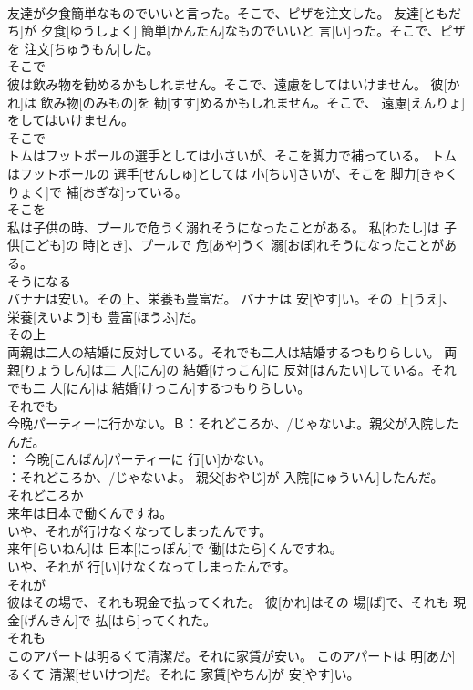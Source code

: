 \documentclass[8pt]{extreport}
\begin{document}
\begin{CJK}{UTF8}{min}
\\	友達が夕食簡単なものでいいと言った。そこで、ピザを注文した。	友達[ともだち]が 夕食[ゆうしょく] 簡単[かんたん]なものでいいと 言[い]った。そこで、ピザを 注文[ちゅうもん]した。	
\\	そこで	
\\	彼は飲み物を勧めるかもしれません。そこで、遠慮をしてはいけません。	彼[かれ]は 飲み物[のみもの]を 勧[すす]めるかもしれません。そこで、 遠慮[えんりょ]をしてはいけません。	
\\	そこで 
\\	トムはフットボールの選手としては小さいが、そこを脚力で補っている。	トムはフットボールの 選手[せんしゅ]としては 小[ちい]さいが、そこを 脚力[きゃくりょく]で 補[おぎな]っている。	
\\	そこを	
\\	私は子供の時、プールで危うく溺れそうになったことがある。	私[わたし]は 子供[こども]の 時[とき]、プールで 危[あや]うく 溺[おぼ]れそうになったことがある。	
\\	そうになる	
\\	バナナは安い。その上、栄養も豊富だ。	バナナは 安[やす]い。その 上[うえ]、 栄養[えいよう]も 豊富[ほうふ]だ。	
\\	その上	
\\	両親は二人の結婚に反対している。それでも二人は結婚するつもりらしい。	両親[りょうしん]は二 人[にん]の 結婚[けっこん]に 反対[はんたい]している。それでも二 人[にん]は 結婚[けっこん]するつもりらしい。	
\\	それでも	
\\	今晩パーティーに行かない。Ｂ：それどころ{か、/じゃないよ。}親父が入院したんだ。	
\\	[えい]： 今晩[こんばん]パーティーに 行[い]かない。 
\\	[びー]：それどころ{か、/じゃないよ。} 親父[おやじ]が 入院[にゅういん]したんだ。	
\\	それどころか	
\\	来年は日本で働くんですね。
\\	いや、それが行けなくなってしまったんです。	
\\	来年[らいねん]は 日本[にっぽん]で 働[はたら]くんですね。 
\\	いや、それが 行[い]けなくなってしまったんです。	
\\	それが	
\\	彼はその場で、それも現金で払ってくれた。	彼[かれ]はその 場[ば]で、それも 現金[げんきん]で 払[はら]ってくれた。	
\\	それも	
\\	このアパートは明るくて清潔だ。それに家賃が安い。	このアパートは 明[あか]るくて 清潔[せいけつ]だ。それに 家賃[やちん]が 安[やす]い。	

\end{CJK}
\end{document}
